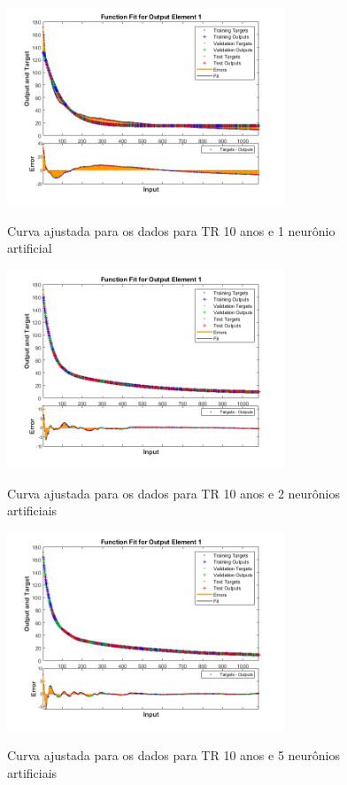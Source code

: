 \begin{figure}[H]
    \caption{Curva ajustada para os dados para TR 10 anos e 1 neurônio artificial}
    \centering
    \includegraphics[width=0.74\textwidth]{Textuais/Figuras/NN/tr10-1neuronio.png}
    \label{fig:tr10-1n}
\end{figure}

\begin{figure}[H]
    \caption{Curva ajustada para os dados para TR 10 anos e 2 neurônios artificiais}
    \centering
    \includegraphics[width=0.74\textwidth]{Textuais/Figuras/NN/tr10-2neuronio.png}
    \label{fig:tr10-2n}
\end{figure}

\begin{figure}[H]
    \caption{Curva ajustada para os dados para TR 10 anos e 5 neurônios artificiais}
    \centering
    \includegraphics[width=0.74\textwidth]{Textuais/Figuras/NN/tr10-5neuronio.png}
    \label{fig:tr10-5n}
\end{figure}

